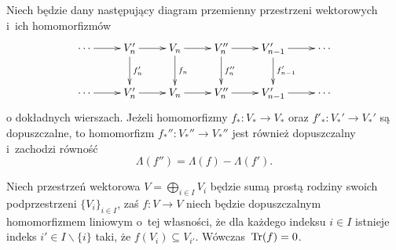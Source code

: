 \begin{lem}\label{lem-2gi_lemat_o_liczbie_lefschetza}
Niech będzie dany następujący diagram przemienny przestrzeni wektorowych i~ich homomorfizmów
\[\xymatrix{\cdots\ar[r]& V_n'\ar[r]\ar[d]^{f_n'}& V_n\ar[r]\ar[d]^{f_n}& V_n''\ar[r]\ar[d]^{f_n''}& V_{n-1}'\ar[r]\ar[d]^{f_{n-1}'}& \cdots \\
\cdots\ar[r]& V_n'\ar[r]& V_n\ar[r]& V_n''\ar[r]& V_{n-1}'\ar[r]& \cdots}\]
o dokładnych wierszach. Jeżeli homomorfizmy $f_*\colon V_*\to V_*$ oraz $f'_*\colon V_*'\to V_*'$ są dopuszczalne, to homomorfizm $f_*''\colon V_*''\to V_*''$ jest również dopuszczalny i~zachodzi równość \[\Lambda(f'')=\Lambda(f)-\Lambda(f').\]
\end{lem}

\begin{lem}\label{lem-permutowanie_podprzestrzeni_a_liczba_lefschetza}
Niech przestrzeń wektorowa $V=\bigoplus_{i\in I}V_i$ będzie sumą prostą rodziny swoich podprzestrzeni $\{V_i\}_{i\in I}$, zaś $f\colon V\to V$ niech będzie dopuszczalnym homomorfizmem liniowym o~tej własności, że dla każdego indeksu $i\in I$ istnieje indeks $i'\in I\smallsetminus\{i\}$ taki, że $f(V_i)\subseteq V_{i'}$. Wówczas~$\operatorname{Tr}(f)=0$.
\end{lem}
